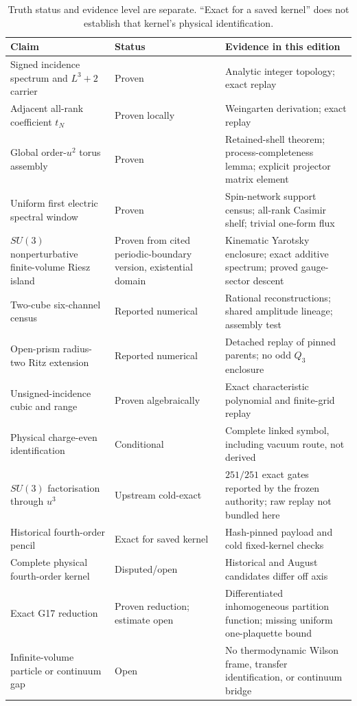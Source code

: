 \documentclass[11pt]{article}
\theoremstyle{plain}
\theoremstyle{definition}
\theoremstyle{remark}
\begin{document}
\begin{table}[ht]
\centering
\small
\begin{tabular}{@{}>{\raggedright\arraybackslash}p{}
                    >{\raggedright\arraybackslash}p{}
                    >{\raggedright\arraybackslash}p{}@{}}
\toprule
Claim & Status & Evidence in this edition \\
\midrule
Signed incidence spectrum and $L^3+2$ carrier
 & Proven & Analytic integer topology; exact replay \\
Adjacent all-rank coefficient $t_N$
 & Proven locally & Weingarten derivation; exact replay \\
Global order-$u^2$ torus assembly
 & Proven & Retained-shell theorem; process-completeness lemma; explicit projector matrix element \\
Uniform first electric spectral window
 & Proven & Spin-network support census; all-rank Casimir shelf; trivial one-form flux \\
$SU(3)$ nonperturbative finite-volume Riesz island
 & Proven from cited periodic-boundary version, existential domain
 & Kinematic Yarotsky enclosure; exact additive spectrum; proved gauge-sector descent \\
Two-cube six-channel census
 & Reported numerical & Rational reconstructions; shared amplitude lineage; assembly test \\
Open-prism radius-two Ritz extension
 & Reported numerical & Detached replay of pinned parents; no odd $Q_3$ enclosure \\
Unsigned-incidence cubic and range
 & Proven algebraically & Exact characteristic polynomial and finite-grid replay \\
Physical charge-even identification
 & Conditional & Complete linked symbol, including vacuum route, not derived \\
$SU(3)$ factorisation through $u^3$
 & Upstream cold-exact & $251/251$ exact gates reported by the frozen authority; raw replay not bundled here \\
Historical fourth-order pencil
 & Exact for saved kernel & Hash-pinned payload and cold fixed-kernel checks \\
Complete physical fourth-order kernel
 & Disputed/open & Historical and August candidates differ off axis \\
Exact G17 reduction
 & Proven reduction; estimate open & Differentiated inhomogeneous partition function; missing uniform one-plaquette bound \\
Infinite-volume particle or continuum gap
 & Open & No thermodynamic Wilson frame, transfer identification, or continuum bridge \\
\bottomrule
\end{tabular}
\caption{Truth status and evidence level are separate. ``Exact for a saved
kernel'' does not establish that kernel's physical identification.}
\label{tab:evidence}
\end{table}
\end{document}
